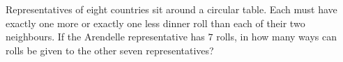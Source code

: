 Representatives of eight countries sit around a circular table. Each must have exactly one more or exactly one less dinner roll than each of their two neighbours. If the Arendelle representative has $7$ rolls, in how many ways can rolls be given to the other seven representatives?
